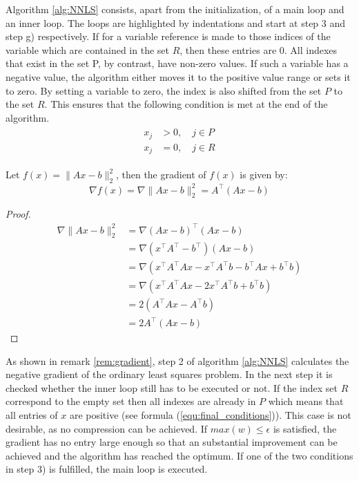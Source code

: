 Algorithm \ref{alg:NNLS} consists, apart from the initialization, of a main loop and an inner loop. The loops are highlighted by indentations and start at step 3 and step g) respectively. If for a variable reference is made to those indices of the variable which are contained in the set $R$, then these entries are 0. All indexes that exist in the set P, by contrast, have non-zero values. If such a variable has a negative value, the algorithm either moves it to the positive value range or sets it to zero. By setting a variable to zero, the index is also shifted from the set $P$ to the set $R$. This ensures that the following condition is met at the end of the algorithm.   
\begin{align}\label{equ:final_conditions}
\begin{split}
	x_j &> 0, \quad j \in P \\
	x_j &= 0, \quad j \in R
\end{split}
\end{align}



\begin{remark}\label{rem:gradient}
	Let $f(x) = \lVert Ax -b \rVert_2^2$, then the gradient of $f(x)$ is given by: 
	\begin{equation*}
		\nabla f(x) = \nabla \lVert Ax -b \rVert_2^2 = A^\top(Ax-b)
	\end{equation*}
	\begin{proof}	
		\begin{align*}
			\nabla \lVert Ax -b \rVert_2^2	&= \nabla (Ax-b)^\top (Ax-b) \\
											&= \nabla (x^\top A^\top - b^\top)(Ax-b) \\
											&= \nabla (x^\top A^\top Ax - x^\top A^\top b - b^\top Ax + b^\top b) \\
											&= \nabla (x^\top A^\top Ax - 2x^\top A^\top b + b^\top b) \\
											&= 2 (A^\top A x - A^\top b) \\
											&= 2A^\top (Ax - b)
		\end{align*}
	\end{proof}
\end{remark}

As shown in remark \ref{rem:gradient}, step 2 of algorithm \ref{alg:NNLS} calculates the negative gradient of the ordinary least squares problem. In the next step it is checked whether the inner loop still has to be executed or not. If the index set $R$ correspond to the empty set then all indexes are already in $P$ which means that all entries of $x$ are positive (see formula (\ref{equ:final_conditions})). This case is not desirable, as no compression can be achieved. If $max(w) \leq \epsilon$ is satisfied, the gradient has no entry large enough so that an substantial improvement can be achieved and the algorithm has reached the optimum. If one of the two conditions in step 3) is fulfilled, the main loop is executed. 


